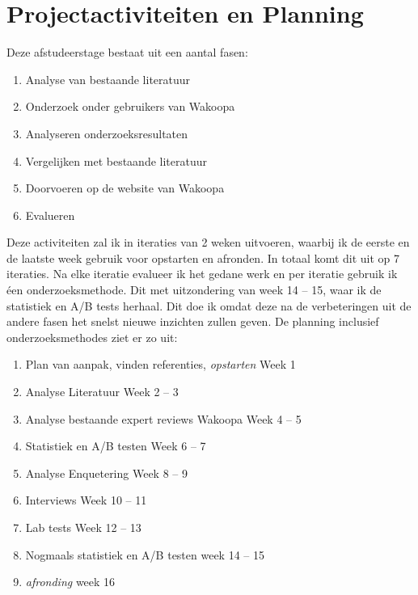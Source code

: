 \documentclass[a4paper, 10pt, pdftex]{article}
\begin{document}
\section{Projectactiviteiten en Planning}
Deze afstudeerstage bestaat uit een aantal fasen:

\begin{enumerate}
\item
Analyse van bestaande literatuur
\item
Onderzoek onder gebruikers van Wakoopa
\item
Analyseren onderzoeksresultaten
\item
Vergelijken met bestaande literatuur
\item
Doorvoeren op de website van Wakoopa
\item
Evalueren
\end{enumerate}

Deze activiteiten zal ik in iteraties van 2 weken uitvoeren, waarbij ik de eerste en de laatste week gebruik voor opstarten en afronden. In totaal komt dit uit op 7 iteraties. Na elke iteratie evalueer ik het gedane werk en per iteratie gebruik ik éen onderzoeksmethode. Dit met uitzondering van week 14 -- 15, waar ik de statistiek en A/B tests herhaal. Dit doe ik omdat deze na de verbeteringen uit de andere fasen het snelst nieuwe inzichten zullen geven. De planning inclusief onderzoeksmethodes ziet er zo uit:

\begin{flushleft}
  \begin{enumerate}
    \item Plan van aanpak, vinden referenties, \emph{opstarten}
      \linebreak Week 1
    \item Analyse Literatuur
      \linebreak Week 2 -- 3
    \item Analyse bestaande expert reviews Wakoopa
      \linebreak Week 4 -- 5
    \item Statistiek en A/B testen
      \linebreak Week 6 -- 7
    \item Analyse Enquetering
      \linebreak Week 8 -- 9
    \item Interviews
      \linebreak Week 10 -- 11
    \item Lab tests
      \linebreak Week 12 -- 13
    \item Nogmaals statistiek en A/B testen
      \linebreak week 14 -- 15
    \item \emph{afronding}
      \linebreak week 16
  \end{enumerate}
\end{flushleft}
\end{document}
